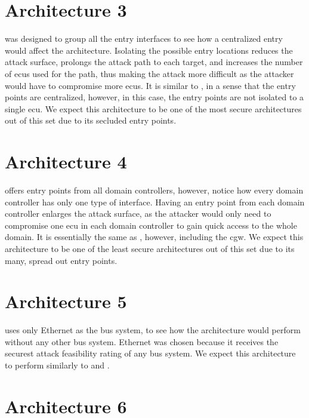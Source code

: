 \section{Architecture 3}
\label{subsec:arch3}

 was designed to group all the entry interfaces to see how a centralized entry would affect the architecture. 
Isolating the possible entry locations reduces the attack surface, prolongs the attack path to each target, 
and increases the number of \acrshort{ecu}s used for the path, thus making the attack more difficult as the attacker would have to compromise more \acrshort{ecu}s. 
It is similar to , in a sense that the entry points are centralized, however, in this case, the entry points are not isolated to a single \acrshort{ecu}.
We expect this architecture to be one of the most secure architectures out of this set due to its secluded entry points.

\section{Architecture 4}
\label{subsec:arch4}

 offers entry points from all domain controllers, 
however, notice how every domain controller has only one type of interface. 
Having an entry point from each domain controller enlarges the attack surface, 
as the attacker would only need to compromise one \acrshort{ecu} in each domain controller to gain quick access to the whole domain. 
It is essentially the same as , however, including the \acrshort{cgw}.
We expect this architecture to be one of the least secure architectures out of this set due to its many, spread out entry points.

\section{Architecture 5}
\label{subsec:arch5}

 uses only Ethernet as the bus system, 
to see how the architecture would perform without any other bus system. 
Ethernet was chosen because it receives the securest attack feasibility rating of any bus system.
We expect this architecture to perform similarly to  and .

\section{Architecture 6}
\label{subsec:arch6}

